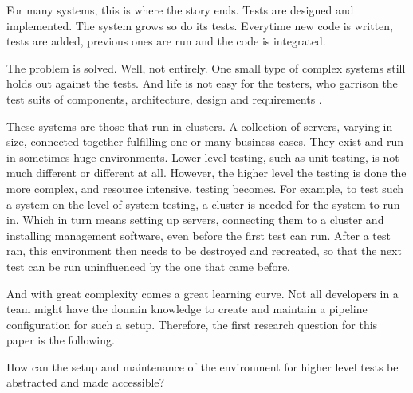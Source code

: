 For many systems, this is where the story ends.
Tests are designed and implemented.
The system grows so do its tests.
Everytime new code is written, tests are added, previous ones are run and the code is integrated.

The problem is solved.
Well, not entirely.
One small type of complex systems still holds out against the tests.
And life is not easy for the testers, who garrison the test suits of components, architecture, design and requirements \cite{AsterixBeginningSentence}.

These systems are those that run in clusters.
A collection of servers, varying in size, connected together fulfilling one or many business cases.
They exist and run in sometimes huge environments.
Lower level testing, such as unit testing, is not much different or different at all.
However, the higher level the testing is done the more complex, and resource intensive, testing becomes.
For example, to test such a system on the level of system testing, a cluster is needed for the system to run in.
Which in turn means setting up servers, connecting them to a cluster and installing management software, even before the first test can run.
After a test ran, this environment then needs to be destroyed and recreated, so that the next test can be run uninfluenced by the one that came before.

And with great complexity comes a great learning curve.
Not all developers in a team might have the domain knowledge to create and maintain a pipeline configuration for such a setup.
Therefore, the first research question for this paper is the following.

How can the setup and maintenance of the environment for higher level tests be abstracted and made accessible?
